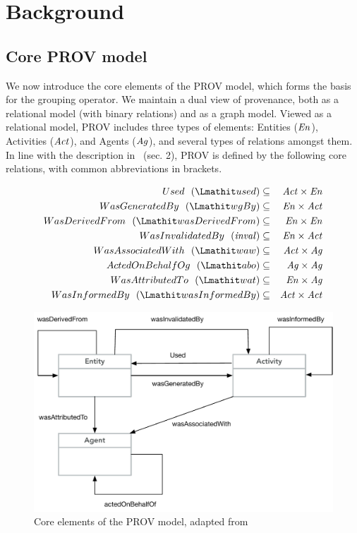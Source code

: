 
\section{Background}
\label{sec:prov-background}

\subsection{Core PROV model} \label{sec:prov-core}

We now introduce the core elements of the PROV model, which forms the basis for the grouping operator.
%
We maintain a dual view of provenance, both as a relational model (with binary relations) and as a graph model. Viewed as a relational model, PROV includes three types of elements: Entities ($\mathit{En}$), Activities ($\mathit{Act}$), and Agents ($\mathit{Ag}$), and several types of relations amongst them. 
In line with the description in~\citep{w3c-prov-dm} (sec. 2), PROV is defined by the following core relations, with common abbreviations in brackets. 

\begin{eqnarray*}
Used~~(\used)  & \subseteq & \act \times \en \\
WasGeneratedBy~~(\wgby) & \subseteq  & \en \times \act \\
WasDerivedFrom~~(\wdf) & \subseteq   & \en \times \en \\
WasInvalidatedBy~~(\inv) &  \subseteq &  \en \times \act \\
WasAssociatedWith~~(\waw) & \subseteq & \act \times \ag \\
ActedOnBehalfOg~~(\delegate) & \subseteq & \ag \times \ag \\ 
WasAttributedTo~~(\attrTo) & \subseteq & \en \times \ag \\
WasInformedBy~~(\wasInfBy) & \subseteq & \act \times \act
\end{eqnarray*}


\begin{figure}
\centering
\includegraphics[scale=.45]{figures/prov-essentials.pdf} 
\caption{Core elements of the PROV model, adapted from~\citep{w3c-prov-dm}}
\label{fig:prov-core}
\end{figure}

